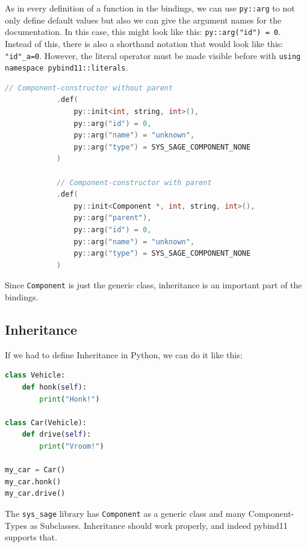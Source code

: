As in every definition of a function in the bindings, we can use \verb|py::arg| to not only define default values but also we can give the argument names for the documentation. In this case, this might look like this: \verb|py::arg("id") = 0|. Instead of this, there is also a shorthand notation that would look like this: \verb|"id"_a=0|. However, the literal operator must be made visible before with \verb|using namespace pybind11::literals|. \cite[see Advanced Topics/Functions]{pybind11-docu}
\begin{lstlisting}[language=C++, xleftmargin=4em, frame = single]
            // Component-constructor without parent
            .def(
                py::init<int, string, int>(),
                py::arg("id") = 0,
                py::arg("name") = "unknown",
                py::arg("type") = SYS_SAGE_COMPONENT_NONE
            )
            
            // Component-constructor with parent
            .def(
                py::init<Component *, int, string, int>(),
                py::arg("parent"),
                py::arg("id") = 0,
                py::arg("name") = "unknown",
                py::arg("type") = SYS_SAGE_COMPONENT_NONE
            )
\end{lstlisting}
\smallskip
Since \verb|Component| is just the generic class, inheritance is an important part of the bindings.

\subsection{Inheritance}

If we had to define Inheritance in Python, we can do it like this:
\begin{lstlisting}[language=Python, xleftmargin=4em, frame = single]
class Vehicle:
    def honk(self):
        print("Honk!")

class Car(Vehicle):
    def drive(self):
        print("Vroom!")

my_car = Car()
my_car.honk()
my_car.drive()
\end{lstlisting}

The \verb|sys_sage| library has \verb|Component| as a generic class and many Component-Types as Subclasses. Inheritance should work properly, and indeed pybind11 supports that.

